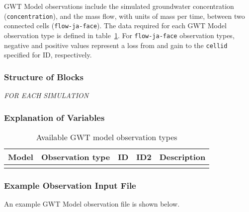 
GWT Model observations include the simulated groundwater concentration (\texttt{concentration}), and the mass flow, with units of mass per time, between two connected cells (\texttt{flow-ja-face}). The data required for each GWT Model observation type is defined in table~\ref{table:gwtobstype}. For \texttt{flow-ja-face} observation types, negative and positive values represent a loss from and gain to the \texttt{cellid} specified for ID, respectively.

\subsubsection{Structure of Blocks}
\vspace{5mm}

\noindent \textit{FOR EACH SIMULATION}



\subsubsection{Explanation of Variables}
\begin{description}

\end{description}


\begin{longtable}{p{2cm} p{2.75cm} p{2cm} p{1.25cm} p{7cm}}
\caption{Available GWT model observation types} \tabularnewline

\hline
\hline
\textbf{Model} & \textbf{Observation type} & \textbf{ID} & \textbf{ID2} & \textbf{Description} \\
\hline
\endhead

\hline
\endfoot


\label{table:gwtobstype}
\end{longtable}

\vspace{5mm}
\subsubsection{Example Observation Input File}

An example GWT Model observation file is shown below.



